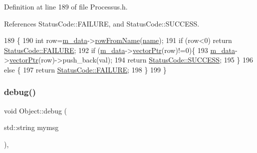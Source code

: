 Definition at line 189 of file Processus.\+h.



References Status\+Code\+::\+F\+A\+I\+L\+U\+RE, and Status\+Code\+::\+S\+U\+C\+C\+E\+SS.


\begin{DoxyCode}
189                                                  \{
190     \textcolor{keywordtype}{int} row=\hyperlink{classProcessus_a3da9a9de8af54e2f47807a3e09dfccff}{m\_data}->\hyperlink{classData_a72f9afe0edb22ad39871292f9f4d3d38}{rowFromName}(\hyperlink{classObject_a300f4c05dd468c7bb8b3c968868443c1}{name});
191     \textcolor{keywordflow}{if} (row<0) \textcolor{keywordflow}{return} \hyperlink{classStatusCode_a6f565cbeadc76d14c72f047e5e85eb4ba3da73d4c469762eb9d3c960368252b26}{StatusCode::FAILURE};
192     \textcolor{keywordflow}{if} (\hyperlink{classProcessus_a3da9a9de8af54e2f47807a3e09dfccff}{m\_data}->\hyperlink{classData_aa2153cb57f6f1a67b54eafe5582e0b6b}{vectorPtr}(row)!=0)\{
193       \hyperlink{classProcessus_a3da9a9de8af54e2f47807a3e09dfccff}{m\_data}->\hyperlink{classData_aa2153cb57f6f1a67b54eafe5582e0b6b}{vectorPtr}(row)->push\_back(val);
194       \textcolor{keywordflow}{return} \hyperlink{classStatusCode_a6f565cbeadc76d14c72f047e5e85eb4badd0da38d3ba0d922efd1f4619bc37ad8}{StatusCode::SUCCESS};
195     \}
196     \textcolor{keywordflow}{else} \{
197       \textcolor{keywordflow}{return} \hyperlink{classStatusCode_a6f565cbeadc76d14c72f047e5e85eb4ba3da73d4c469762eb9d3c960368252b26}{StatusCode::FAILURE};
198     \}
199   \}
\end{DoxyCode}
\mbox{\label{classObject_aac010553f022165573714b7014a15f0d}} 
\subsubsection{\texorpdfstring{debug()}{debug()}\hspace{0.1cm}{\footnotesize\ttfamily [1/2]}}
{\footnotesize\ttfamily void Object\+::debug (\begin{DoxyParamCaption}\item[{std\+::string}]{mymsg }\end{DoxyParamCaption})\hspace{0.3cm}{\ttfamily [inline]}, {\ttfamily [inherited]}}



